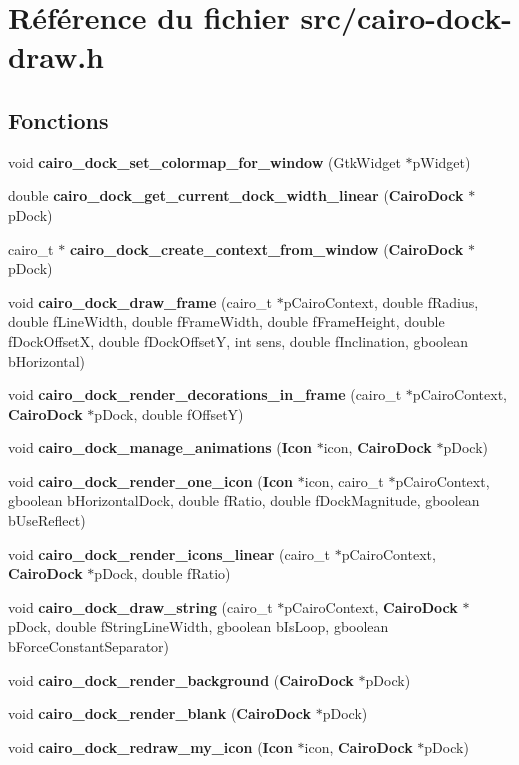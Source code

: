 \section{Référence du fichier src/cairo-dock-draw.h}
\label{cairo-dock-draw_8h}
\subsection*{Fonctions}
\begin{CompactItemize}
\item 
void {\bf cairo\_\-dock\_\-set\_\-colormap\_\-for\_\-window} (GtkWidget $\ast$pWidget)
\item 
double {\bf cairo\_\-dock\_\-get\_\-current\_\-dock\_\-width\_\-linear} ({\bf CairoDock} $\ast$pDock)
\item 
cairo\_\-t $\ast$ {\bf cairo\_\-dock\_\-create\_\-context\_\-from\_\-window} ({\bf CairoDock} $\ast$pDock)
\item 
void {\bf cairo\_\-dock\_\-draw\_\-frame} (cairo\_\-t $\ast$pCairoContext, double fRadius, double fLineWidth, double fFrameWidth, double fFrameHeight, double fDockOffsetX, double fDockOffsetY, int sens, double fInclination, gboolean bHorizontal)
\item 
void {\bf cairo\_\-dock\_\-render\_\-decorations\_\-in\_\-frame} (cairo\_\-t $\ast$pCairoContext, {\bf CairoDock} $\ast$pDock, double fOffsetY)
\item 
void {\bf cairo\_\-dock\_\-manage\_\-animations} ({\bf Icon} $\ast$icon, {\bf CairoDock} $\ast$pDock)
\item 
void {\bf cairo\_\-dock\_\-render\_\-one\_\-icon} ({\bf Icon} $\ast$icon, cairo\_\-t $\ast$pCairoContext, gboolean bHorizontalDock, double fRatio, double fDockMagnitude, gboolean bUseReflect)
\item 
void {\bf cairo\_\-dock\_\-render\_\-icons\_\-linear} (cairo\_\-t $\ast$pCairoContext, {\bf CairoDock} $\ast$pDock, double fRatio)
\item 
void {\bf cairo\_\-dock\_\-draw\_\-string} (cairo\_\-t $\ast$pCairoContext, {\bf CairoDock} $\ast$pDock, double fStringLineWidth, gboolean bIsLoop, gboolean bForceConstantSeparator)
\item 
void {\bf cairo\_\-dock\_\-render\_\-background} ({\bf CairoDock} $\ast$pDock)
\item 
void {\bf cairo\_\-dock\_\-render\_\-blank} ({\bf CairoDock} $\ast$pDock)
\item 
void {\bf cairo\_\-dock\_\-redraw\_\-my\_\-icon} ({\bf Icon} $\ast$icon, {\bf CairoDock} $\ast$pDock)

\end{CompactItemize}
